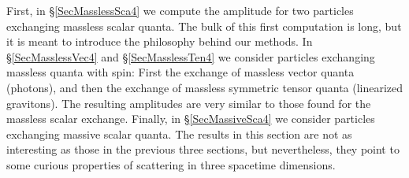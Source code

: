 First, in \S\ref{SecMasslessSca4} we compute the amplitude for two particles exchanging massless scalar quanta. The bulk of this first computation is long, but it is meant to introduce the philosophy behind our methods. In \S\ref{SecMasslessVec4} and \S\ref{SecMasslessTen4} we consider particles exchanging massless quanta with spin: First the exchange of massless vector quanta (photons), and then the exchange of massless symmetric tensor quanta (linearized gravitons). The resulting amplitudes are very similar to those found for the massless scalar exchange. Finally, in \S\ref{SecMassiveSca4} we consider particles exchanging massive scalar quanta. The results in this section are not as interesting as those in the previous three sections, but nevertheless, they point to some curious properties of scattering in three spacetime dimensions.




